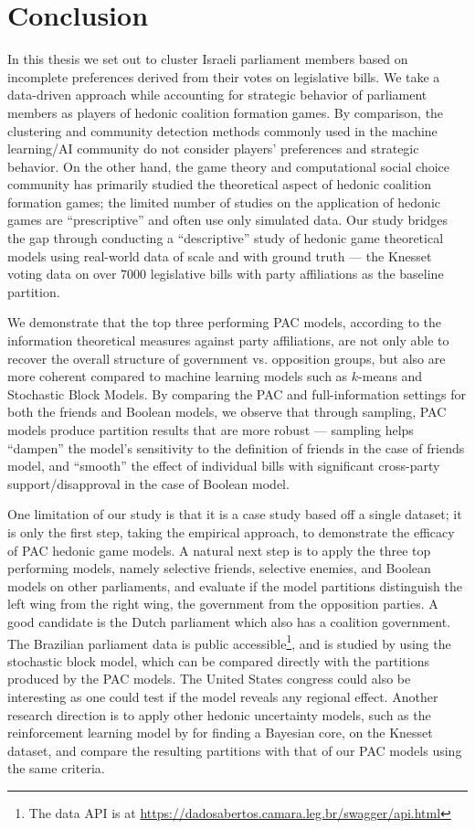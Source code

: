 \chapter{Conclusion}
\label{ch:concl}

In this thesis we set out to cluster Israeli parliament members
based on incomplete preferences derived from their votes on legislative bills.
We take a data-driven approach while accounting for strategic behavior of
parliament members as players of hedonic coalition formation games.
By comparison, the clustering and community detection methods commonly used in
the machine learning/AI community do not consider players' preferences and
strategic behavior.
On the other hand, the game theory and computational social choice community has primarily
studied the theoretical aspect of hedonic coalition formation games;
the limited number of studies on the application of hedonic games are
``prescriptive'' and often use only simulated data.
Our study bridges the gap through conducting a ``descriptive'' study of hedonic
game theoretical models using real-world data of scale and with ground truth ---
the Knesset voting data on over 7000 legislative bills with party affiliations as
the baseline partition.

We demonstrate that the top three performing PAC models, according to the
information theoretical measures against party affiliations, are not only able
to recover the overall structure of government vs. opposition groups, but also
are more coherent compared to machine learning models such as $k$-means and
Stochastic Block Models.
By comparing the PAC and full-information settings for both the friends
and Boolean models, we observe that through sampling, PAC models produce
partition results that are more robust --- sampling helps ``dampen'' the
model's sensitivity to the definition of friends in the case of friends model,
and ``smooth'' the effect of individual bills with significant cross-party
support/disapproval in the case of Boolean model.

One limitation of our study is that it is a case study based off a single
dataset; it is only the first step, taking the empirical approach, to
demonstrate the efficacy of PAC hedonic game models.
A natural next step is to apply the three top performing models, namely
selective friends, selective enemies, and Boolean models on other parliaments,
and evaluate if the model partitions distinguish the left wing from the right
wing, the government from the opposition parties.
A good candidate is the Dutch parliament which also has a coalition government. 
The Brazilian parliament data is public accessible\footnote{The data API is at
\url{https://dadosabertos.camara.leg.br/swagger/api.html}}, and is studied by
 using the stochastic block model, which can be compared
directly with the partitions produced by the PAC models.
The United States congress could also be interesting as one could test if the
model reveals any regional effect.
Another research direction is to apply other hedonic uncertainty models, such
as the reinforcement learning model by  for
finding a Bayesian core, on the Knesset dataset, and compare the resulting
partitions with that of our PAC models using the same criteria.